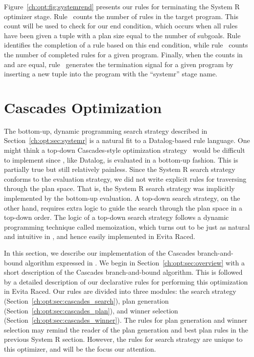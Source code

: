 Figure~\ref{ch:opt:fig:systemrend} presents our rules for terminating the
System R optimizer stage.  Rule~ counts the number of rules in the target
program.  This count will be used to check for our end condition, which occurs
when all rules have been given a  tuple with a plan size equal to
the number of subgoals.  Rule~ identifies the completion of a rule based
on this end condition, while rule~ counts the number of completed rules
for a given program.  Finally, when the counts in  and
 are equal, rule~ generates the termination signal for a given
program by inserting a new tuple into the  program with the ``systemr''
stage name.

\section{Cascades Optimization}
\label{ch:opt:sec:cascades}

The bottom-up, dynamic programming search strategy described in
Section~\ref{ch:opt:sec:systemr} is a natural fit to a Datalog-based rule
language.  One might think a top-down Cascades-style optimization
strategy~\cite{cascades} would be difficult to implement since \OVERLOG, like
Datalog, is evaluated in a bottom-up fashion.  This is partially true but still
relatively painless.  Since the System R search strategy conforms to the
\OVERLOG evaluation strategy, we did not write explicit rules for traversing
through the plan space.  That is, the System R search strategy was implicitly
implemented by the \OVERLOG bottom-up evaluation.  A top-down search strategy,
on the other hand, requires extra logic to guide the search through the plan
space in a top-down order.  The logic of a top-down search strategy follows a
dynamic programming technique called memoization, which turns out to be just as
natural and intuitive in \OVERLOG, and hence easily implemented in Evita Raced.

In this section, we describe our implementation of the Cascades
branch-and-bound algorithm expressed in \OVERLOG.  We begin in
Section~\ref{ch:opt:sec:overview} with a short description of the Cascades
branch-and-bound algorithm.  This is followed by a detailed description of our
declarative rules for performing this optimization in Evita Raced.  Our rules
are divided into three modules: the search strategy
(Section~\ref{ch:opt:sec:cascades_search}), plan generation
(Section~\ref{ch:opt:sec:cascades_plan}), and winner selection
(Section~\ref{ch:opt:sec:cascades_winner}).  The rules for plan generation and
winner selection may remind the reader of the plan generation and best plan
rules in the previous System R section.  However, the rules for search strategy
are unique to this optimizer, and will be the focus our attention.

